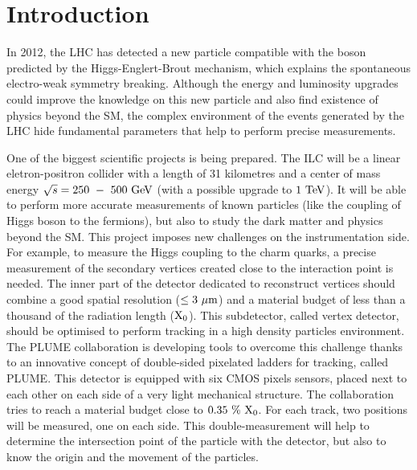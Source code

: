 \chapter{Introduction}

  In 2012, the \gls{LHC} has detected a new particle compatible with the boson predicted by the Higgs-Englert-Brout mechanism, which explains the spontaneous electro-weak symmetry breaking.
  Although the energy and luminosity upgrades could improve the knowledge on this new particle and also find existence of physics beyond the \gls{SM}, the complex environment of the events generated by the \gls{LHC} hide fundamental parameters that help to perform precise measurements.

  One of the biggest scientific projects is being prepared. 
  The \gls{ILC} will be a linear eletron-positron collider with a length of 31 kilometres and a center of mass energy  $\sqrt{s} = 250~-~500~\rm{GeV}$ (with a possible upgrade to $1~\rm{TeV}$). 
  It will be able to perform more accurate measurements of known particles (like the coupling of Higgs boson to the fermions), but also to study the dark matter and physics beyond the \gls{SM}. 
  This project imposes new challenges on the instrumentation side. 
  For example, to measure the Higgs coupling to the charm quarks, a precise measurement of the secondary vertices created close to the interaction point is needed.
  The inner part of the detector dedicated to reconstruct vertices should combine a good spatial resolution ($\leq 3~\rm{\mu m}$) and a material budget of less than a thousand of the radiation length ($\rm{X_0}$).
  This subdetector, called vertex detector, should be optimised to perform tracking in a high density particles environment.
  The PLUME collaboration is developing tools to overcome this challenge thanks to an innovative concept of double-sided pixelated ladders for tracking, called \gls{PLUME}. 
  This detector is equipped with six CMOS pixels sensors, placed next to each other on each side of a very light mechanical structure. 
  The collaboration tries to reach a material budget close to $0.35~\%~\rm{X_0}$. 
  For each track, two positions will be measured, one on each side. 
  This double-measurement will help to determine the intersection point of the particle with the detector, but also to know the origin and the movement of the particles.

